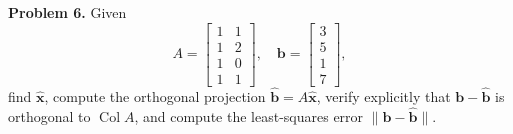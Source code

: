 \documentclass[11pt, letterpaper]{article}
\theoremstyle{definition}
\theoremstyle{remark}
\begin{document}
\textbf{Problem 6.} Given
\[
A = \begin{bmatrix} 1 & 1 \\ 1 & 2 \\ 1 & 0 \\ 1 & 1 \end{bmatrix}, \quad \mathbf{b} = \begin{bmatrix} 3 \\ 5 \\ 1 \\ 7 \end{bmatrix},
\]
find $\hat{\mathbf{x}}$, compute the orthogonal projection $\hat{\mathbf{b}} = A\hat{\mathbf{x}}$, verify explicitly that $\mathbf{b} - \hat{\mathbf{b}}$ is orthogonal to $\operatorname{Col} A$, and compute the least-squares error $\|\mathbf{b} - \hat{\mathbf{b}}\|$.
\end{document}
